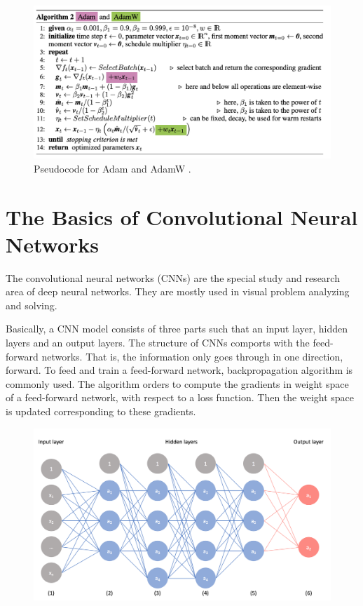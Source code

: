 \begin{figure}[h]
	\centering
	\includegraphics[width=\linewidth]{fig/adam_n_adamw.png}
	\vspace*{1mm}
	\caption{Pseudocode for Adam and AdamW \cite{weight_decay_regularization}.}
	\label{adam_and_adamw}
\end{figure}

\section{The Basics of Convolutional Neural Networks} \label{basics_of_cnn}

The convolutional neural networks (CNNs) are the special study and research area of deep neural networks. They are mostly used in visual problem analyzing and solving.

Basically, a CNN model consists of three parts such that an input layer, hidden layers and an output layers. The structure of CNNs comports with the feed-forward networks. That is, the information only goes through in one direction, forward. To feed and train a feed-forward network, backpropagation algorithm is commonly used. The algorithm orders to compute the gradients in weight space of a feed-forward network, with respect to a loss function. Then the weight space is updated corresponding to these gradients. 

\begin{figure}[h]
	\centering
	\includegraphics[width=.8\linewidth]{fig/basic_cnn_sample.png}
	\vspace*{1mm}
	\label{basic_cnn_sample}
\end{figure}

